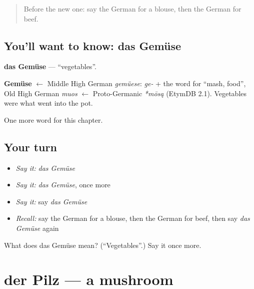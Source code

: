 \label{lesson:GE-C120-gemuese}



\begin{quote}
Before the new one: say the German for a blouse, then the German for beef.
\end{quote}

\subsection*{You'll want to know: das Gemüse}
\textbf{das Gemüse} — \textquotedblleft{}vegetables\textquotedblright{}.

\begin{cousinweb}
\textbf{Gemüse} $\leftarrow$ Middle High German \emph{gemüese}: \emph{ge-} + the word for \textquotedblleft{}mash, food\textquotedblright{}, Old High German \emph{muos} $\leftarrow$ Proto-Germanic \emph{*mōsą} (EtymDB 2.1). Vegetables were what went into the pot.
\end{cousinweb}

\begin{grammarlens}[title={What you've built}]
One more word for this chapter.
\end{grammarlens}

\subsection*{Your turn}
\begin{itemize}
\raggedright
  \item \emph{Say it:} \emph{das Gemüse}
  \item \emph{Say it:} \emph{das Gemüse}, once more
  \item \emph{Say it:} say \emph{das Gemüse}
  \item \emph{Recall:} say the German for a blouse, then the German for beef, then say \emph{das Gemüse} again
\end{itemize}

\begin{tcolorbox}[breakable,colback=teal!4,colframe=teal!35!black,title={Before you move on}]
What does das Gemüse mean? (\textquotedblleft{}Vegetables\textquotedblright{}.) Say it once more.
\end{tcolorbox}
\section[der Pilz]{der Pilz — a mushroom}

\label{lesson:GE-C120-pilz}



